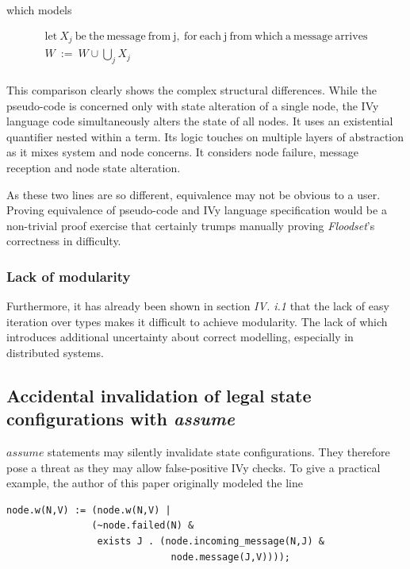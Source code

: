 \documentclass[fleqn]{article}
\begin{document}
\noindent which models

\begin{mdframed}[nobreak=true, backgroundcolor=light-gray, roundcorner=10pt,leftmargin=1, rightmargin=1, innerleftmargin=15, innertopmargin=15,innerbottommargin=15, outerlinewidth=1, linecolor=light-gray]
\begin{gather*}
  \mathrm{let}\ X_j\ \mathrm{be\ the\ message\ from\ j,\ for\ each\ j\ from\ which\ a\ message\ arrives}\\
  W\ :=\ W \cup \bigcup_{j} X_j\\
\end{gather*}
\end{mdframed}

This comparison clearly shows the complex structural differences. While the pseudo-code is concerned only with state alteration of a single node, the IVy language code simultaneously alters the state of all nodes. It uses an existential quantifier nested within a term. Its logic touches on multiple layers of abstraction as it mixes system and node concerns. It considers node failure, message reception and node state alteration.

As these two lines are so different, equivalence may not be obvious to a user. Proving equivalence of pseudo-code and IVy language specification would be a non-trivial proof exercise that certainly trumps manually proving \textit{Floodset}'s correctness in difficulty.

\subsubsection{Lack of modularity}
Furthermore, it has already been shown in section \textit{IV. i.1} that the lack of easy iteration over types makes it difficult to achieve modularity. The lack of which introduces additional uncertainty about correct modelling, especially in distributed systems.


\subsection{Accidental invalidation of legal state configurations with \textit{assume}}
$assume$ statements may silently invalidate state configurations. They therefore pose a threat as they
may allow false-positive IVy checks.
To give a practical example, the author of this paper originally modeled the line

\begin{mdframed}[nobreak=true, backgroundcolor=light-gray, roundcorner=10pt,leftmargin=1, rightmargin=1, innerleftmargin=15, innertopmargin=15,innerbottommargin=15, outerlinewidth=1, linecolor=light-gray]
\begin{lstlisting}
node.w(N,V) := (node.w(N,V) |
               (~node.failed(N) &
                exists J . (node.incoming_message(N,J) &
                             node.message(J,V))));
\end{lstlisting}
\end{mdframed}
\end{document}
